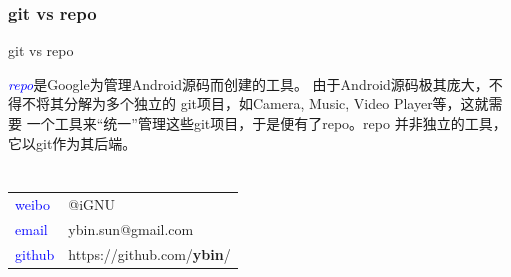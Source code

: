 ﻿\documentclass{beamer}
\begin{document}
\section[git vs repo]{git vs repo}
\begin{frame}{git vs repo}
\begin{framedtext}
{
  \textcolor{blue}{\emph{repo}}是Google为管理Android源码而创建的工具。
  由于Android源码极其庞大，不得不将其分解为多个独立的
  git项目，如Camera, Music, Video Player等，这就需要
  一个工具来“统一”管理这些git项目，于是便有了repo。repo
  并非独立的工具，它以git作为其后端。
}
\end{framedtext}
\end{frame}

\part[\surrounded{/end}]{}
\begin{frame}{}
  \begin{framedtext}
    \begin{tabular}{ll}
      \textcolor{blue}{weibo} & @iGNU \\
      \textcolor{blue}{email} & ybin.sun@gmail.com \\
      \textcolor{blue}{github}& https://github.com/\textbf{ybin}/ \\
    \end{tabular}
  \end{framedtext}
\end{frame}
\end{document}
